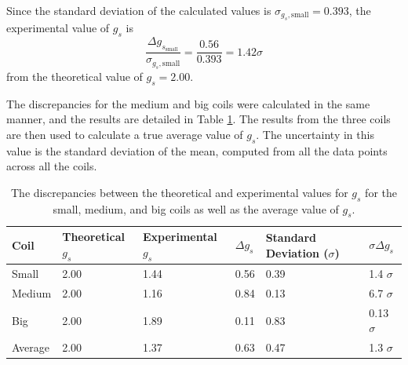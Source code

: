 \documentclass[a4paper]{article}
\begin{document}
Since the standard deviation of the calculated values is
\( \sigma_{g_s, \text{small}} = 0.393 \), the experimental value of \( g_s \) is $$
\frac{\Delta g_{s_{\text{small}}}}{\sigma_{g_s, \text{small}}} = \frac{0.56}{0.393} = 1.42
\sigma $$ from the theoretical value of $g_s = 2.00$.

\newpage

\qq The discrepancies for the medium and big coils were calculated in the same
manner, and the results are detailed in Table \ref{tab:discrepancyG}. The results
from the three coils are then used to calculate a true average value of \( g_s
\). The uncertainty in this value is the standard deviation of the mean, computed from all the data
points across all the coils.

\begin{table}[H]
  \caption{The discrepancies between the theoretical and experimental values for
    \( g_s \) for the small, medium, and big coils as well as the average value
    of \( g_s \).}
  \begin{center}
    \begin{tabular}{|l|l|l|l|l|l|}
      \hline
      Coil & Theoretical \( g_s \) & Experimental \( g_s \) & \( \Delta g_s \) &
                                                                                 Standard
                                                                                 Deviation
                                                                                 (\(
                                                                                 \sigma
                                                                                 \)) &
                                                                                 \(
                                                                                 \sigma
                                                                                 \Delta
                                                                                 g_s
                                                                                 \)
      \\
      \hline
      Small & 2.00 & 1.44 & 0.56 & 0.39 & 1.4 \( \sigma \) \\
      Medium & 2.00 & 1.16 & 0.84 & 0.13 & 6.7 \( \sigma \) \\
      Big & 2.00 & 1.89 & 0.11 & 0.83 & 0.13 \( \sigma \) \\
      \hline
      Average & 2.00 & 1.37 & 0.63 & 0.47 & 1.3 \( \sigma \) \\
      \hline
    \end{tabular}
  \end{center}
  \label{tab:discrepancyG}
\end{table}
\end{document}

